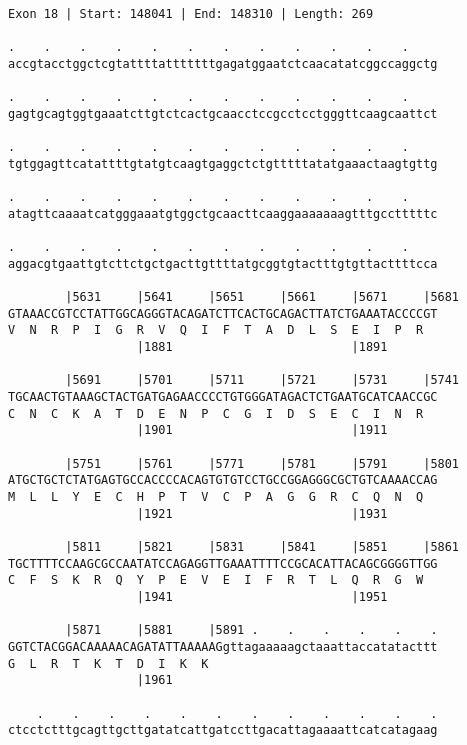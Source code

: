 \documentclass{article}
\begin{document}
\begin{Verbatim}[fontfamily=courier]
Exon 18 | Start: 148041 | End: 148310 | Length: 269

.    .    .    .    .    .    .    .    .    .    .    .    
accgtacctggctcgtattttatttttttgagatggaatctcaacatatcggccaggctg

.    .    .    .    .    .    .    .    .    .    .    .    
gagtgcagtggtgaaatcttgtctcactgcaacctccgcctcctgggttcaagcaattct

.    .    .    .    .    .    .    .    .    .    .    .    
tgtggagttcatattttgtatgtcaagtgaggctctgtttttatatgaaactaagtgttg

.    .    .    .    .    .    .    .    .    .    .    .    
atagttcaaaatcatgggaaatgtggctgcaacttcaaggaaaaaaagtttgcctttttc

.    .    .    .    .    .    .    .    .    .    .    .    
aggacgtgaattgtcttctgctgacttgttttatgcggtgtactttgtgttacttttcca

        |5631     |5641     |5651     |5661     |5671     |5681
GTAAACCGTCCTATTGGCAGGGTACAGATCTTCACTGCAGACTTATCTGAAATACCCCGT
V  N  R  P  I  G  R  V  Q  I  F  T  A  D  L  S  E  I  P  R  
                  |1881                         |1891       

        |5691     |5701     |5711     |5721     |5731     |5741
TGCAACTGTAAAGCTACTGATGAGAACCCCTGTGGGATAGACTCTGAATGCATCAACCGC
C  N  C  K  A  T  D  E  N  P  C  G  I  D  S  E  C  I  N  R  
                  |1901                         |1911       

        |5751     |5761     |5771     |5781     |5791     |5801
ATGCTGCTCTATGAGTGCCACCCCACAGTGTGTCCTGCCGGAGGGCGCTGTCAAAACCAG
M  L  L  Y  E  C  H  P  T  V  C  P  A  G  G  R  C  Q  N  Q  
                  |1921                         |1931       

        |5811     |5821     |5831     |5841     |5851     |5861
TGCTTTTCCAAGCGCCAATATCCAGAGGTTGAAATTTTCCGCACATTACAGCGGGGTTGG
C  F  S  K  R  Q  Y  P  E  V  E  I  F  R  T  L  Q  R  G  W  
                  |1941                         |1951       

        |5871     |5881     |5891 .    .    .    .    .    .
GGTCTACGGACAAAAACAGATATTAAAAAGgttagaaaaagctaaattaccatatacttt
G  L  R  T  K  T  D  I  K  K                                
                  |1961                                     

    .    .    .    .    .    .    .    .    .    .    .    .
ctcctctttgcagttgcttgatatcattgatccttgacattagaaaattcatcatagaag

\end{Verbatim}
\end{document}
